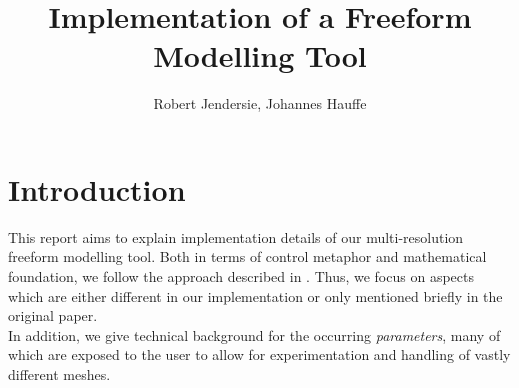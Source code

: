 \documentclass[twocolumn]{article}
\begin{document}
\title{Implementation of a Freeform Modelling Tool }


\author{Robert Jendersie, Johannes Hauffe}

\maketitle

\section{Introduction}
This report aims to explain implementation details of our multi-resolution freeform modelling tool.
Both in terms of control metaphor and mathematical foundation, we follow the approach described in  \cite{botsch2004intuitive}. Thus, we focus on aspects which are either different in our implementation or only mentioned briefly in the original paper.\\
In addition, we give technical background for the occurring \textit{parameters}, many of which are exposed to the user to allow for experimentation and handling of vastly different meshes.
\end{document}

